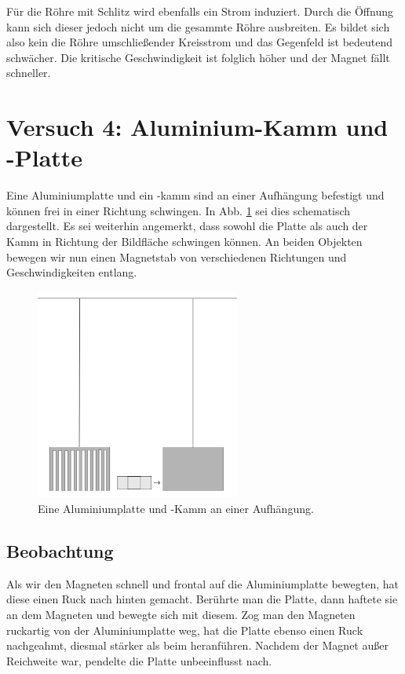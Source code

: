 \documentclass[11pt,a4paper,titlepage, ngerman]{article}
\begin{document}
			Für die Röhre mit Schlitz wird ebenfalls ein Strom induziert.
			Durch die Öffnung kann sich dieser jedoch nicht um die gesammte Röhre ausbreiten.
			Es bildet sich also kein die Röhre umschließender Kreisstrom und das Gegenfeld ist bedeutend schwächer.
			Die kritische Geschwindigkeit ist folglich höher und der Magnet fällt schneller.		
					
	\section{Versuch 4: Aluminium-Kamm und -Platte} 
	
		Eine Aluminiumplatte und ein -kamm sind an einer Aufhängung befestigt und können frei in einer Richtung schwingen.
		In Abb. \ref{fig:Aluplatte} sei dies schematisch dargestellt.
		Es sei weiterhin angemerkt, dass sowohl die Platte als auch der Kamm in Richtung der Bildfläche schwingen können.
		An beiden Objekten bewegen wir nun einen Magnetstab von verschiedenen Richtungen und Geschwindigkeiten entlang.
		\begin{figure}[ht]
			\centering
			\includegraphics[width=0.6\textwidth]{Alu-Platte.png}
			\caption{Eine Aluminiumplatte und -Kamm an einer Aufhängung.} 
			\label{fig:Aluplatte}
		\end{figure}
		
		\subsection*{Beobachtung}
		
			Als wir den Magneten schnell und frontal auf die Aluminiumplatte bewegten, hat diese einen Ruck nach hinten gemacht.
			Berührte man die Platte, dann haftete sie an dem Magneten und bewegte sich mit diesem.
			Zog man den Magneten ruckartig von der Aluminiumplatte weg, hat die Platte ebenso einen Ruck nachgeahmt, diesmal stärker als beim heranführen.
			Nachdem der Magnet außer Reichweite war, pendelte die Platte unbeeinflusst nach.
			
\end{document}
